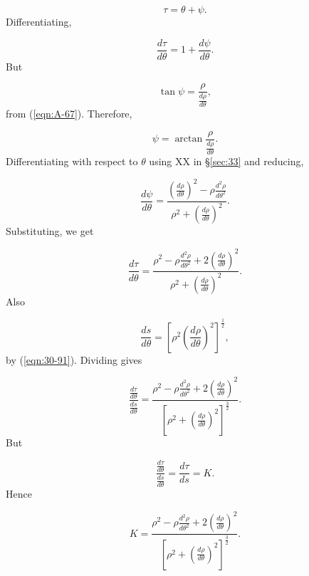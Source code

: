 \[
\tau 	= \theta + \psi. 
\]
Differentiating,

\[
\frac{d\tau}{d\theta} 	
= 1 + \frac{d\psi}{d\theta}.
\]
But 	

\[
\tan \psi 	
= \frac{\rho}{\frac{d\rho}{d\theta}},
\]
from (\ref{eqn:A-67}). %
Therefore, 

\[
\psi 	= \arctan \frac{\rho}{ \frac{d\rho}{d\theta} }.
\]
Differentiating with respect to $\theta$ using XX in \S \ref{sec:33}
and reducing,

\[
\frac{d\psi}{d\theta} 	
= \frac{ \left( \frac{d\rho}{d\theta} \right)^2 
- \rho \frac{d^2 \rho}{d\theta^2} }{ \rho^2 
+ \left( \frac{d\rho}{d\theta} \right)^2 }.
\]
Substituting, %
we get

\[
\frac{d\tau}{d\theta} 	
= \frac{\rho^2 - \rho \frac{d^2 \rho}{d\theta^2} 
+ 2 \left( \frac{d\rho}{d\theta} \right)^2}{\rho^2 
+ \left( \frac{d\rho}{d\theta} \right)^2}. 
\]
Also

\[
\frac{ds}{d\theta} 	
= \left[ \rho^2 \left( \frac{d\rho}{d\theta} 
\right)^2 \right]^{\frac{1}{2}},
\]
by (\ref{eqn:30-91}). %
Dividing %
gives

\[
\frac{ \frac{d\tau}{d\theta} }{ \frac{ds}{d\theta} } 	
= \frac{ \rho^2 - \rho \frac{d^2 \rho}{d\theta^2} 
+ 2 \left( \frac{d\rho}{d\theta} \right)^2 }{ \left[ \rho^2 
+ \left( \frac{d\rho}{d\theta} \right)^2 \right]^{\frac{3}{2}} }.
\]
But 	

\[
\frac{ \frac{d\tau}{d\theta} }{ \frac{ds}{d\theta} } 	
= \frac{d\tau}{ds} = K. 
\]
Hence

\begin{equation}
K 	
= \frac{ \rho^2 - \rho \frac{d^2 \rho}{d\theta^2} 
+ 2 \left( \frac{d\rho}{d\theta} \right)^2 }{ \left[ \rho^2 
+ \left( \frac{d\rho}{d\theta} \right)^2 \right]^{\frac{3}{2}} }.
\label{eqn:41-102}
\end{equation}

